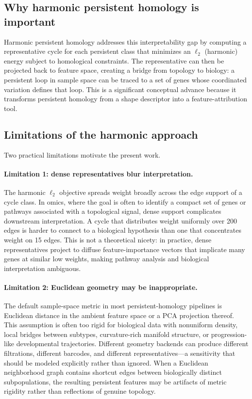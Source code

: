 \documentclass[11pt]{article}
\begin{document}
\subsection{Why harmonic persistent homology is important}

Harmonic persistent homology \cite{harmonicPH} addresses this interpretability gap by computing a representative cycle for each persistent class that minimizes an $\ell_2$ (harmonic) energy subject to homological constraints.
The representative can then be projected back to feature space, creating a bridge from topology to biology: a persistent loop in sample space can be traced to a set of genes whose coordinated variation defines that loop.
This is a significant conceptual advance because it transforms persistent homology from a shape descriptor into a feature-attribution tool.

\subsection{Limitations of the harmonic approach}

Two practical limitations motivate the present work.

\paragraph{Limitation 1: dense representatives blur interpretation.}
The harmonic $\ell_2$ objective spreads weight broadly across the edge support of a cycle class.
In omics, where the goal is often to identify a compact set of genes or pathways associated with a topological signal, dense support complicates downstream interpretation.
A cycle that distributes weight uniformly over 200 edges is harder to connect to a biological hypothesis than one that concentrates weight on 15 edges.
This is not a theoretical nicety: in practice, dense representatives project to diffuse feature-importance vectors that implicate many genes at similar low weights, making pathway analysis and biological interpretation ambiguous.

\paragraph{Limitation 2: Euclidean geometry may be inappropriate.}
The default sample-space metric in most persistent-homology pipelines is Euclidean distance in the ambient feature space or a PCA projection thereof.
This assumption is often too rigid for biological data with nonuniform density, local bridges between subtypes, curvature-rich manifold structure, or progression-like developmental trajectories.
Different geometry backends can produce different filtrations, different barcodes, and different representatives---a sensitivity that should be modeled explicitly rather than ignored.
When a Euclidean neighborhood graph contains shortcut edges between biologically distinct subpopulations, the resulting persistent features may be artifacts of metric rigidity rather than reflections of genuine topology.
\end{document}
